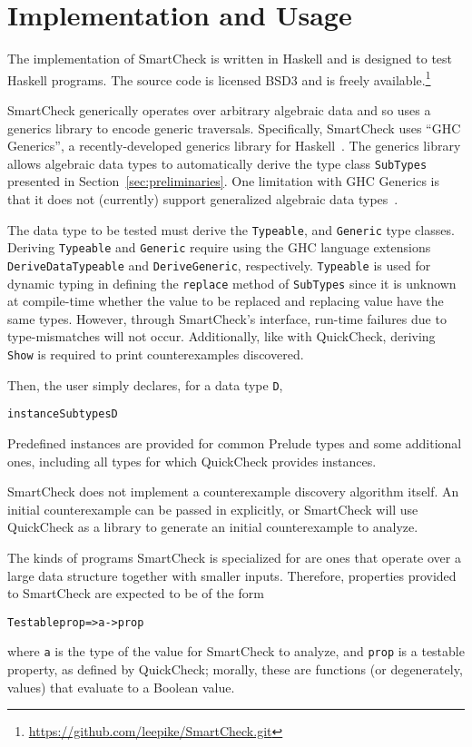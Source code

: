 \documentclass{sigplanconf}
\newenvironment{code}{\begin{alltt}\footnotesize}{\end{alltt}}
\newcommand{\ttp}[1]{\texttt{#1}}
\begin{document}
\section{Implementation and Usage}\label{sec:implementation}

The implementation of SmartCheck is written in Haskell and is designed to test
Haskell programs.  The source code is licensed BSD3 and is freely
available.\footnote{\url{https://github.com/leepike/SmartCheck.git}}

SmartCheck generically operates over arbitrary algebraic data and so uses a
generics library to encode generic traversals.  Specifically, SmartCheck uses
``GHC Generics'', a recently-developed generics library for
Haskell~\cite{generics}.  The generics library allows algebraic data types to
automatically derive the type class \ttp{SubTypes} presented in
Section~\ref{sec:preliminaries}.  One limitation with GHC Generics is that it
does not (currently) support generalized algebraic data types~\cite{gadts}.

The data type to be tested must derive the \ttp{Typeable}, and \ttp{Generic}
type classes.  Deriving \ttp{Typeable} and \ttp{Generic} require using the GHC
language extensions \ttp{DeriveDataTypeable} and \ttp{DeriveGeneric},
respectively.  \ttp{Typeable} is used for dynamic typing in defining the
\ttp{replace} method of \ttp{SubTypes} since it is unknown at compile-time
whether the value to be replaced and replacing value have the same types.
However, through SmartCheck's interface, run-time failures due to
type-mismatches will not occur.  Additionally, like with QuickCheck, deriving
\ttp{Show} is required to print counterexamples discovered.

Then, the user simply declares, for a data type \ttp{D},
%
\begin{code}
instance Subtypes D
\end{code}
%
Predefined instances are provided for common Prelude types and some additional
ones, including all types for which QuickCheck provides instances.

SmartCheck does not implement a counterexample discovery algorithm itself.  An
initial counterexample can be passed in explicitly, or SmartCheck will use
QuickCheck as a library to generate an initial counterexample to analyze.

The kinds of programs SmartCheck is specialized for are ones that operate over a
large data structure together with smaller inputs.  Therefore, properties
provided to SmartCheck are expected to be of the form
%
\begin{code}
Testable prop => a -> prop
\end{code}
%
where \ttp{a} is the type of the value for SmartCheck to analyze, and \ttp{prop}
is a testable property, as defined by QuickCheck; morally, these are functions
(or degenerately, values) that evaluate to a Boolean value.
\end{document}
